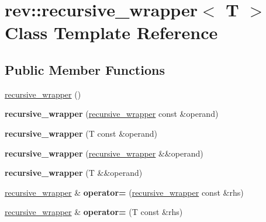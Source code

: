 \hypertarget{classrev_1_1recursive__wrapper}{}\section{rev\+::recursive\+\_\+wrapper$<$ T $>$ Class Template Reference}
\label{classrev_1_1recursive__wrapper}
\subsection*{Public Member Functions}
\begin{DoxyCompactItemize}
\item 
\mbox{\hyperlink{classrev_1_1recursive__wrapper_a9b69cc8c57f6e2d0c96bc19fcbe59a9f}{recursive\+\_\+wrapper}} ()
\item 
\mbox{\label{classrev_1_1recursive__wrapper_a7dc688c1d3504a3120e67b5c44ed13d1}} 
{\bfseries recursive\+\_\+wrapper} (\mbox{\hyperlink{classrev_1_1recursive__wrapper}{recursive\+\_\+wrapper}} const \&operand)
\item 
\mbox{\label{classrev_1_1recursive__wrapper_a9ef790f196cd8ab361e0ef1d773a5f02}} 
{\bfseries recursive\+\_\+wrapper} (T const \&operand)
\item 
\mbox{\label{classrev_1_1recursive__wrapper_abca25f103e883b1366935807b336a355}} 
{\bfseries recursive\+\_\+wrapper} (\mbox{\hyperlink{classrev_1_1recursive__wrapper}{recursive\+\_\+wrapper}} \&\&operand)
\item 
\mbox{\label{classrev_1_1recursive__wrapper_aab5a61a51381dbd2e8b3a2d950547cd2}} 
{\bfseries recursive\+\_\+wrapper} (T \&\&operand)
\item 
\mbox{\label{classrev_1_1recursive__wrapper_a1a1eeeb5e6630ad01de2b8227a4a4616}} 
\mbox{\hyperlink{classrev_1_1recursive__wrapper}{recursive\+\_\+wrapper}} \& {\bfseries operator=} (\mbox{\hyperlink{classrev_1_1recursive__wrapper}{recursive\+\_\+wrapper}} const \&rhs)
\item 
\mbox{\label{classrev_1_1recursive__wrapper_a6f9b006c7a592859b40f1f334ce19db5}} 
\mbox{\hyperlink{classrev_1_1recursive__wrapper}{recursive\+\_\+wrapper}} \& {\bfseries operator=} (T const \&rhs)

\end{DoxyCompactItemize}

